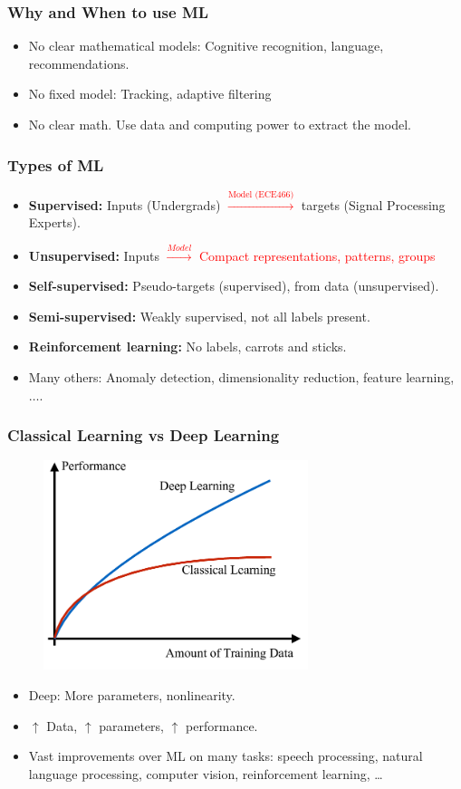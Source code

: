 \documentclass[a4,xcolor=dvipsnames]{beamer}
\begin{document}
\begin{frame}
    \frametitle{Why and When to use ML}
    \begin{itemize}
        \item No clear mathematical models: Cognitive recognition, language, recommendations.
        \item No fixed model: Tracking, adaptive filtering
        \item No clear math. Use data and computing power to extract the model.
    \end{itemize}
\end{frame}

\begin{frame}
    \frametitle{Types of ML}
    
    \begin{itemize}
        \item \textbf{Supervised:} Inputs (Undergrads) \textcolor{red}{$\xrightarrow{\text{Model (ECE466)}}$} targets (Signal Processing Experts).
        \item \textbf{Unsupervised:} Inputs \textcolor{red}{$\xrightarrow{Model}$ Compact representations, patterns, groups}
        \item \textbf{Self-supervised:} Pseudo-targets (supervised), from data (unsupervised).
        \item \textbf{Semi-supervised:} Weakly supervised, not all labels present.
        \item \textbf{Reinforcement learning:} No labels, carrots and sticks.
        \item Many others: Anomaly detection, dimensionality reduction, feature learning, $\ldots$.
    \end{itemize}
\end{frame}

\begin{frame}
    \frametitle{Classical Learning vs Deep Learning}
    \begin{figure}
        \centering
        \includegraphics[width=.4\textwidth]{MLvsDL.png}
    \end{figure}
    \begin{itemize}
        \item Deep: More parameters, nonlinearity.
        \item $\uparrow$ Data, $\uparrow$ parameters, $\uparrow$ performance.
        \item Vast improvements over ML on many tasks: speech processing, natural language processing, computer vision, reinforcement learning, \ldots
    \end{itemize}
\end{frame}
\end{document}
